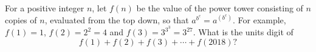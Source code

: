 For a positive integer $n$, let $f(n)$ be the value of the power tower consisting of $n$ copies of $n$, evaluated from the top down, so that $a^{b^c}=a^{\left(b^c\right)}$. For example, $f(1)=1$, $f(2)=2^2=4$ and $f(3)=3^{3^3}=3^{27}$. What is the units digit of
\[
f(1)+f(2)+f(3)+\cdots+f(2018)?
\]
